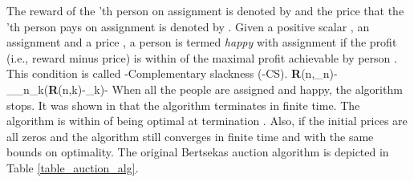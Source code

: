 \documentclass[11pt,onecolumn]{article}
\newcommand{\beq}{}
\begin{document}
The reward of the 'th person on assignment  is denoted by 
and the price that the 'th person pays on assignment  is denoted by
.
Given a positive scalar , an assignment  and a price , a person  is termed \emph{happy} with assignment  if the profit (i.e., reward minus price) is within  of the maximal profit achievable by person . This condition is called -Complementary slackness (-CS).
\beq\label{eq_ecs}
\textbf{R}(n,\eta_n)-\rho_{\eta_n}\geq\max_k(\textbf{R}(n,k)-\rho_k)-\epsilon
\eeq
When all the people are assigned and happy, the algorithm stops. It was shown in \cite{bertsekas1979distributed} that the algorithm terminates in finite time. The algorithm is within  of being optimal at termination \cite{bertsekas1979distributed}. Also, if the initial prices are all zeros and  the algorithm still converges in finite time and with the same bounds on optimality. The original Bertsekas auction algorithm is depicted in Table \ref{table_auction_alg}.
\end{document}
